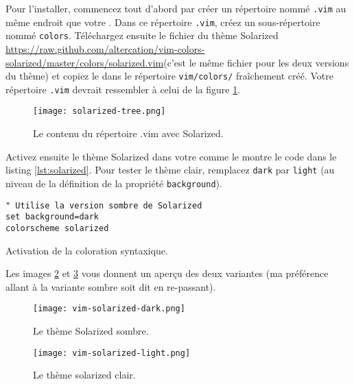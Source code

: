 Pour l'installer, commencez tout d'abord par créer un répertoire nommé \Verb|.vim| au même endroit que votre \vimrc{}. Dans ce répertoire \Verb|.vim|, créez un sous-répertoire nommé \Verb|colors|. Téléchargez ensuite le fichier du thème Solarized \url{https://raw.github.com/altercation/vim-colors-solarized/master/colors/solarized.vim}(c'est le même fichier pour les deux versions du thème) et copiez le dans le répertoire \Verb|vim/colors/| fraîchement créé. Votre répertoire \Verb|.vim| devrait ressembler à celui de la figure \ref{fig:solarized-tree}.

\begin{figure}%
  \center
  \texttt{[image: solarized-tree.png]}
  \caption{Le contenu du répertoire .vim avec Solarized.}
  \label{fig:solarized-tree}
\end{figure}

Activez ensuite le thème Solarized dans votre \vimrc comme le montre le code dans le listing \ref{lst:solarized}. Pour tester le thème clair, remplacez \Verb|dark| par \Verb|light| (au niveau de la définition de la propriété \Verb|background|).

\begin{listing}[H]
\begin{verbatim}
" Utilise la version sombre de Solarized
set background=dark
colorscheme solarized
\end{verbatim}
  \caption{Activation de la coloration syntaxique.}
  \label{lst:solarized}
\end{listing}

Les images \ref{fig:vim-solarized-dark} et \ref{fig:vim-solarized-light} vous donnent un aperçu des deux variantes (ma préférence allant à la variante sombre soit dit en re-passant).

\begin{figure}%
  \texttt{[image: vim-solarized-dark.png]}
  \caption{Le thème Solarized sombre.}
  \label{fig:vim-solarized-dark}
\end{figure}

\begin{figure}%
  \texttt{[image: vim-solarized-light.png]}
  \caption{Le thème solarized clair.}
  \label{fig:vim-solarized-light}
\end{figure}

